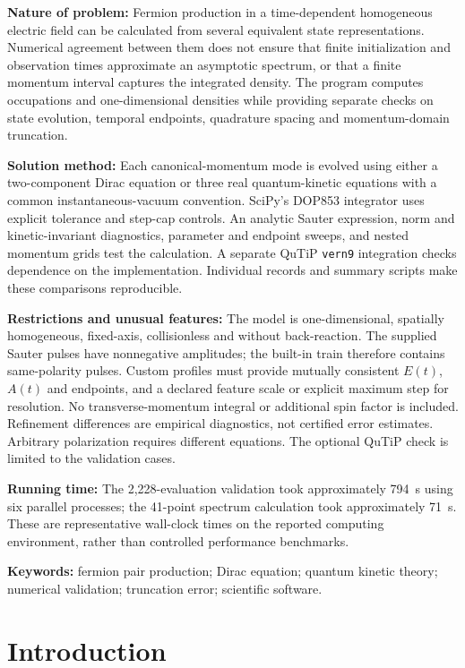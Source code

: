 \documentclass[11pt,a4paper]{article}
\begin{document}
\noindent\textbf{Nature of problem:} Fermion production in a time-dependent homogeneous electric field can be calculated from several equivalent state representations. Numerical agreement between them does not ensure that finite initialization and observation times approximate an asymptotic spectrum, or that a finite momentum interval captures the integrated density. The program computes occupations and one-dimensional densities while providing separate checks on state evolution, temporal endpoints, quadrature spacing and momentum-domain truncation.

\noindent\textbf{Solution method:} Each canonical-momentum mode is evolved using either a two-component Dirac equation or three real quantum-kinetic equations with a common instantaneous-vacuum convention. SciPy's DOP853 integrator uses explicit tolerance and step-cap controls. An analytic Sauter expression, norm and kinetic-invariant diagnostics, parameter and endpoint sweeps, and nested momentum grids test the calculation. A separate QuTiP \texttt{vern9} integration checks dependence on the implementation. Individual records and summary scripts make these comparisons reproducible.

\noindent\textbf{Restrictions and unusual features:} The model is one-dimensional, spatially homogeneous, fixed-axis, collisionless and without back-reaction. The supplied Sauter pulses have nonnegative amplitudes; the built-in train therefore contains same-polarity pulses. Custom profiles must provide mutually consistent $E(t)$, $A(t)$ and endpoints, and a declared feature scale or explicit maximum step for resolution. No transverse-momentum integral or additional spin factor is included. Refinement differences are empirical diagnostics, not certified error estimates. Arbitrary polarization requires different equations. The optional QuTiP check is limited to the validation cases.

\noindent\textbf{Running time:} The 2,228-evaluation validation took approximately 794~s using six parallel processes; the 41-point spectrum calculation took approximately 71~s. These are representative wall-clock times on the reported computing environment, rather than controlled performance benchmarks.

\noindent\textbf{Keywords:} fermion pair production; Dirac equation; quantum kinetic theory; numerical validation; truncation error; scientific software.

\section{Introduction}
\end{document}
